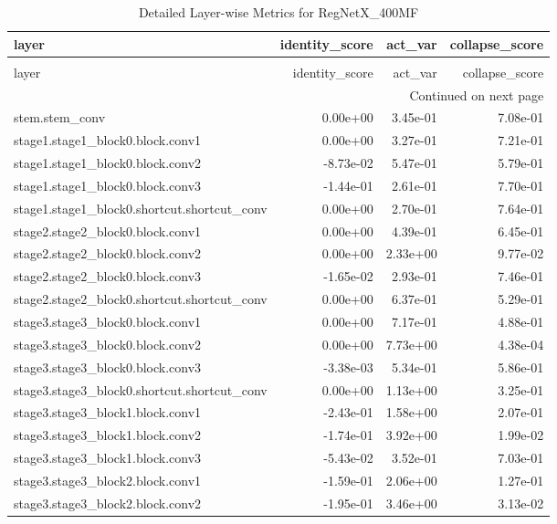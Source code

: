 \begin{longtable}{lrrr}
\caption{Detailed Layer-wise Metrics for RegNetX_400MF} \label{tab:layer_metrics_regnetx_400mf} \\
\toprule
layer & identity_score & act_var & collapse_score \\
\midrule
\endfirsthead
\caption[]{Detailed Layer-wise Metrics for RegNetX_400MF} \\
\toprule
layer & identity_score & act_var & collapse_score \\
\midrule
\endhead
\midrule
\multicolumn{4}{r}{Continued on next page} \\
\midrule
\endfoot
\bottomrule
\endlastfoot
stem.stem_conv & 0.00e+00 & 3.45e-01 & 7.08e-01 \\
stage1.stage1_block0.block.conv1 & 0.00e+00 & 3.27e-01 & 7.21e-01 \\
stage1.stage1_block0.block.conv2 & -8.73e-02 & 5.47e-01 & 5.79e-01 \\
stage1.stage1_block0.block.conv3 & -1.44e-01 & 2.61e-01 & 7.70e-01 \\
stage1.stage1_block0.shortcut.shortcut_conv & 0.00e+00 & 2.70e-01 & 7.64e-01 \\
stage2.stage2_block0.block.conv1 & 0.00e+00 & 4.39e-01 & 6.45e-01 \\
stage2.stage2_block0.block.conv2 & 0.00e+00 & 2.33e+00 & 9.77e-02 \\
stage2.stage2_block0.block.conv3 & -1.65e-02 & 2.93e-01 & 7.46e-01 \\
stage2.stage2_block0.shortcut.shortcut_conv & 0.00e+00 & 6.37e-01 & 5.29e-01 \\
stage3.stage3_block0.block.conv1 & 0.00e+00 & 7.17e-01 & 4.88e-01 \\
stage3.stage3_block0.block.conv2 & 0.00e+00 & 7.73e+00 & 4.38e-04 \\
stage3.stage3_block0.block.conv3 & -3.38e-03 & 5.34e-01 & 5.86e-01 \\
stage3.stage3_block0.shortcut.shortcut_conv & 0.00e+00 & 1.13e+00 & 3.25e-01 \\
stage3.stage3_block1.block.conv1 & -2.43e-01 & 1.58e+00 & 2.07e-01 \\
stage3.stage3_block1.block.conv2 & -1.74e-01 & 3.92e+00 & 1.99e-02 \\
stage3.stage3_block1.block.conv3 & -5.43e-02 & 3.52e-01 & 7.03e-01 \\
stage3.stage3_block2.block.conv1 & -1.59e-01 & 2.06e+00 & 1.27e-01 \\
stage3.stage3_block2.block.conv2 & -1.95e-01 & 3.46e+00 & 3.13e-02 \\

\end{longtable}

